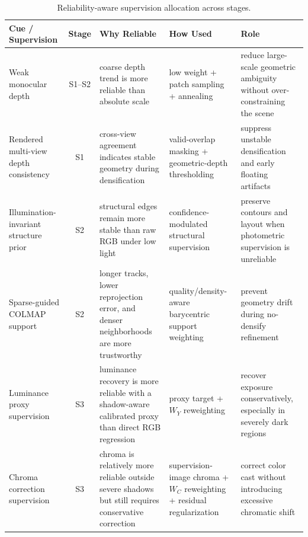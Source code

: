 \begin{table}[t]
\setlength{\tabcolsep}{3pt}
\renewcommand{\arraystretch}{1.08}
\footnotesize
\centering
\begin{tabular}{@{}>{\raggedright\arraybackslash}p{}c>{\raggedright\arraybackslash}p{}>{\raggedright\arraybackslash}p{}>{\raggedright\arraybackslash}p{}@{}}
\toprule
Cue / Supervision & Stage & Why Reliable & How Used & Role \\
\midrule
Weak monocular depth & S1--S2 & coarse depth trend is more reliable than absolute scale & low weight + patch sampling + annealing & reduce large-scale geometric ambiguity without over-constraining the scene \\
Rendered multi-view depth consistency & S1 & cross-view agreement indicates stable geometry during densification & valid-overlap masking + geometric-depth thresholding & suppress unstable densification and early floating artifacts \\
Illumination-invariant structure prior & S2 & structural edges remain more stable than raw RGB under low light & confidence-modulated structural supervision & preserve contours and layout when photometric supervision is unreliable \\
Sparse-guided COLMAP support & S2 & longer tracks, lower reprojection error, and denser neighborhoods are more trustworthy & quality/density-aware barycentric support weighting & prevent geometry drift during no-densify refinement \\
Luminance proxy supervision & S3 & luminance recovery is more reliable with a shadow-aware calibrated proxy than direct RGB regression & proxy target + $W_Y$ reweighting & recover exposure conservatively, especially in severely dark regions \\
Chroma correction supervision & S3 & chroma is relatively more reliable outside severe shadows but still requires conservative correction & supervision-image chroma + $W_C$ reweighting + residual regularization & correct color cast without introducing excessive chromatic shift \\
\bottomrule
\end{tabular}
\caption{Reliability-aware supervision allocation across stages.}
\label{tab:reliability_summary}
\end{table}

